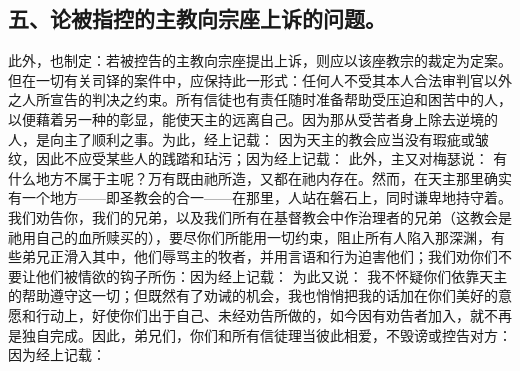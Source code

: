 
\subsection{五、论被指控的主教向宗座上诉的问题。}

此外，也制定：若被控告的主教向宗座提出上诉，则应以该座教宗的裁定为定案。但在一切有关司铎的案件中，应保持此一形式：任何人不受其本人合法审判官以外之人所宣告的判决之约束。所有信徒也有责任随时准备帮助受压迫和困苦中的人，以便藉着另一种的彰显，能使天主的远离自己。因为那从受苦者身上除去逆境的人，是向主了顺利之事。为此，经上记载：  因为天主的教会应当没有瑕疵或皱纹，因此不应受某些人的践踏和玷污；因为经上记载：  此外，主又对梅瑟说：  有什么地方不属于主呢？万有既由祂所造，又都在祂内存在。然而，在天主那里确实有一个地方——即圣教会的合一——在那里，人站在磐石上，同时谦卑地持守着。我们劝告你，我们的兄弟，以及我们所有在基督教会中作治理者的兄弟（这教会是祂用自己的血所赎买的），要尽你们所能用一切约束，阻止所有人陷入那深渊，有些弟兄正滑入其中，他们辱骂主的牧者，并用言语和行为迫害他们；我们劝你们不要让他们被情欲的钩子所伤：因为经上记载：  为此又说：  我不怀疑你们依靠天主的帮助遵守这一切；但既然有了劝诫的机会，我也悄悄把我的话加在你们美好的意愿和行动上，好使你们出于自己、未经劝告所做的，如今因有劝告者加入，就不再是独自完成。因此，弟兄们，你们和所有信徒理当彼此相爱，不毁谤或控告对方：因为经上记载：  